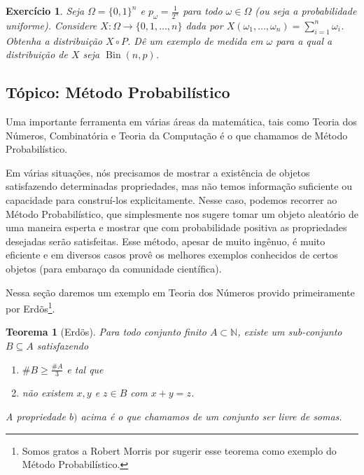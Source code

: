 \documentclass[reqno, draft]{book}
\newcommand*\1{\mathds{1}}
\newtheorem{theorem}{Teorema}[section]
\newtheorem{exercise}[example]{Exercício}
\DeclareMathOperator{\Bin}{Bin}
\newcommand{\todosec}[2]{\ifdraft{\vfill \pagebreak \subsection{#1} #2 \vfill \pagebreak}{}}
\begin{document}
\begin{exercise}
  Seja $\Omega = \{0,1\}^n$ e $p_\omega = \tfrac 1{2^n}$ para todo $\omega \in \Omega$ (ou seja a probabilidade uniforme).
  Considere $X: \Omega \to \{0,1, \dots, n\}$ dada por $X(\omega_1, \dots, \omega_n) = \sum_{i=1}^n \omega_i$.
  Obtenha a distribuição $X \circ P$.
  Dê um exemplo de medida em $\omega$ para a qual a distribuição de $X$ seja $\Bin(n,p)$.
\end{exercise}


\vfill
\pagebreak

\subsection{Tópico: Método Probabilístico}



Uma importante ferramenta em várias áreas da matemática, tais como Teoria dos Números, Combinatória e Teoria da Computação é o que chamamos de Método Probabilístico. 

Em várias situações, nós precisamos de mostrar a existência de objetos satisfazendo determinadas propriedades, mas não temos informação suficiente ou capacidade para construí-los explicitamente.
Nesse caso, podemos recorrer ao Método Probabilístico, que simplesmente nos sugere tomar um objeto aleatório de uma maneira esperta e mostrar que com probabilidade positiva as propriedades desejadas serão satisfeitas.
Esse método, apesar de muito ingênuo, é muito eficiente e em diversos casos provê os melhores exemplos conhecidos de certos objetos (para embaraço da comunidade científica).

Nessa seção daremos um exemplo em Teoria dos Números provido primeiramente por Erdõs\footnote{Somos gratos a Robert Morris por sugerir esse teorema como exemplo do Método Probabilístico.}.

\begin{theorem}[Erdös]
  Para todo conjunto finito $A \subset \mathbb{N}$, existe um sub-conjunto $B \subseteq A$ satisfazendo
  \begin{enumerate}[\quad a)]
  \item $\# B \geq \frac{\#A}{3}$ e tal que
  \item não existem $x, y$ e $z \in B$ com $x + y = z$.
  \end{enumerate}
  A propriedade $b)$ acima é o que chamamos de um conjunto ser livre de somas. 
\end{theorem}
\end{document}
